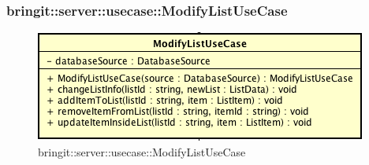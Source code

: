 \subsubsection{bringit::server::usecase::ModifyListUseCase}

\label{bringit::server::usecase::ModifyListUseCase}
\begin{figure}[H]
	\centering
	\includegraphics[scale=0.5]{Sezioni/SottosezioniST/img/app/ModifyListUseCase.png}
	\caption{bringit::server::usecase::ModifyListUseCase}
\end{figure}

